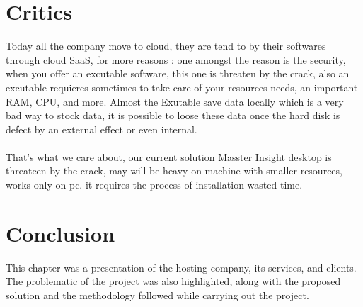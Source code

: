 \documentclass[12pt]{article}
\begin{document}
	\section{Critics}
	Today all the company move to cloud, they are tend to by their softwares through cloud SaaS, for more reasons : one amongst the reason is the security, when you offer an excutable software, this one is threaten by the crack, also an excutable requieres sometimes to take care of your resources needs, an important RAM, CPU, and more. Almost the Exutable save data locally which is a very bad way to stock data, it is possible to loose these data once the hard disk is defect by an external effect or even internal.
	\\
	\\
	That's what we care about, our current solution Masster Insight desktop is threateen by the crack, may will be heavy on machine with smaller resources, works only on pc. it requires the process of installation wasted time.
	  
	\section{Conclusion}
	This chapter was a presentation of the hosting company, its services, and clients. The problematic of the project was also highlighted, along with the proposed solution and the methodology followed while carrying out the project.
	
	 
\end{document}

